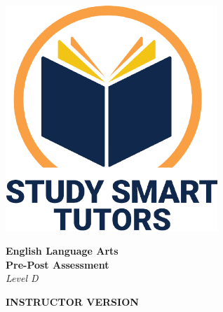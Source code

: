 \documentclass[12pt]{article}
\title{}
\date{}
\newcommand{\levelLetter}{D}
\newcommand{\assessmenttype}{Pre-Post Assessment}
\begin{document}
\thispagestyle{empty}

\vspace*{\fill}

\vspace*{3cm}

\begin{center}

    \includegraphics[width=0.6\textwidth]{SST_Color_Logo.png} %
    
    \vspace{1cm} %
    
    
    \Huge \textbf{English Language Arts \\ \assessmenttype }\\ 
     \vspace{1 cm}
      \LARGE \textit{Level \levelLetter}\\[1cm]
 \vspace{0.5cm}
    
   




       \Huge \textbf{INSTRUCTOR VERSION}
    
\end{center}


\newpage
\thispagestyle{empty}
\vspace*{\fill}
\newpage


\newpage


\end{document}
